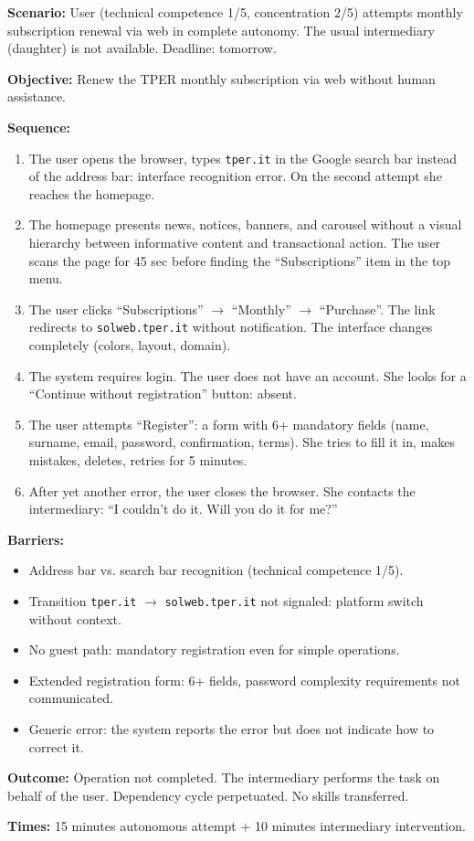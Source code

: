 ﻿\documentclass[11pt,a4paper]{article}
\begin{document}
\begin{tcolorbox}[base]
    {\small
    \textbf{Scenario:} User (technical competence 1/5, concentration 2/5) attempts monthly subscription renewal via web in complete autonomy. The usual intermediary (daughter) is not available. Deadline: tomorrow.

    \textbf{Objective:} Renew the TPER monthly subscription via web without human assistance.

    \textbf{Sequence:}
    \begin{enumerate}
        \item The user opens the browser, types \texttt{tper.it} in the Google search bar instead of the address bar: interface recognition error. On the second attempt she reaches the homepage.
        \item The homepage presents news, notices, banners, and carousel without a visual hierarchy between informative content and transactional action. The user scans the page for 45 sec before finding the ``Subscriptions'' item in the top menu.
        \item The user clicks ``Subscriptions'' $\rightarrow$ ``Monthly'' $\rightarrow$ ``Purchase''. The link redirects to \texttt{solweb.tper.it} without notification. The interface changes completely (colors, layout, domain).
        \item The system requires login. The user does not have an account. She looks for a ``Continue without registration'' button: absent.
        \item The user attempts ``Register'': a form with 6+ mandatory fields (name, surname, email, password, confirmation, terms). She tries to fill it in, makes mistakes, deletes, retries for 5 minutes.
        \item After yet another error, the user closes the browser. She contacts the intermediary: ``I couldn't do it. Will you do it for me?''
    \end{enumerate}

    \textbf{Barriers:}
    \begin{itemize}
        \item Address bar vs. search bar recognition (technical competence 1/5).
        \item Transition \texttt{tper.it} $\rightarrow$ \texttt{solweb.tper.it} not signaled: platform switch without context.
        \item No guest path: mandatory registration even for simple operations.
        \item Extended registration form: 6+ fields, password complexity requirements not communicated.
        \item Generic error: the system reports the error but does not indicate how to correct it.
    \end{itemize}

    \textbf{Outcome:} Operation not completed. The intermediary performs the task on behalf of the user. Dependency cycle perpetuated. No skills transferred.

    \textbf{Times:} 15 minutes autonomous attempt + 10 minutes intermediary intervention.
    }
\end{tcolorbox}
\end{document}
